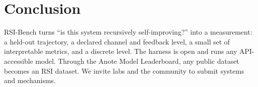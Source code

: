 \documentclass[11pt]{article}
\begin{document}
\section{Conclusion}

RSI-Bench turns ``is this system recursively self-improving?'' into a measurement: a held-out trajectory, a declared channel and feedback level, a small set of interpretable metrics, and a discrete level. The harness is open and runs any API-accessible model. Through the Anote Model Leaderboard, any public dataset becomes an RSI dataset. We invite labs and the community to submit systems and mechanisms.



\end{document}
